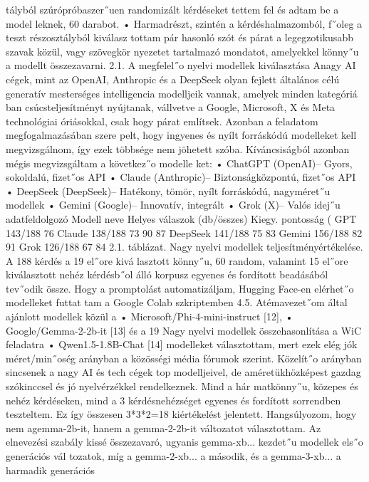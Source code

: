 \documentclass[12pt]{report}
\theoremstyle{definition}
\begin{document}
tályból szúrópróbaszer˝uen randomizált kérdéseket tettem fel és adtam be a model
leknek, 60 darabot.
 • Harmadrészt, szintén a kérdéshalmazomból, f˝oleg a teszt részosztályból kiválasz
tottam pár hasonló szót és párat a legegzotikusabb szavak közül, vagy szövegkör
nyezetet tartalmazó mondatot, amelyekkel könny˝u a modellt összezavarni.
 2.1. A megfelel˝o nyelvi modellek kiválasztása
 Anagy AI cégek, mint az OpenAI, Anthropic és a DeepSeek olyan fejlett általános
 célú generatív mesterséges intelligencia modelljeik vannak, amelyek minden kategóriá
ban csúcsteljesítményt nyújtanak, vállvetve a Google, Microsoft, X és Meta technológiai
 óriásokkal, csak hogy párat említsek. Azonban a feladatom megfogalmazásában szere
pelt, hogy ingyenes és nyílt forráskódú modelleket kell megvizsgálnom, így ezek többsége
 nem jöhetett szóba. Kíváncsiságból azonban mégis megvizsgáltam a következ˝o modelle
ket:
 • ChatGPT (OpenAI)– Gyors, sokoldalú, fizet˝os API
 • Claude (Anthropic)– Biztonságközpontú, fizet˝os API
 • DeepSeek (DeepSeek)– Hatékony, tömör, nyílt forráskódú, nagyméret˝u modellek
 • Gemini (Google)– Innovatív, integrált
 • Grok (X)– Valós idej˝u adatfeldolgozó
 Modell neve Helyes válaszok (db/összes) Kiegy. pontosság (%
 GPT
 143/188
 76
 Claude
 138/188
 73
 90
 87
 DeepSeek
 141/188
 75
 83
 Gemini
 156/188
 82
 91
 Grok
 126/188
 67
 84
 2.1. táblázat. Nagy nyelvi modellek teljesítményértékelése. A 188 kérdés a 19 el˝ore kivá
lasztott könny˝u, 60 random, valamint 15 el˝ore kiválasztott nehéz kérdésb˝ol álló korpusz
 egyenes és fordított beadásából tev˝odik össze.
 Hogy a promptolást automatizáljam, Hugging Face-en elérhet˝o modelleket futtat
tam a Google Colab szkriptemben 4.5.
 Atémavezet˝om által ajánlott modellek közül a
 • Microsoft/Phi-4-mini-instruct [12],
 • Google/Gemma-2-2b-it [13] és a
 19
Nagy nyelvi modellek összehasonlítása a WiC feladatra
 • Qwen1.5-1.8B-Chat [14]
 modelleket választottam, mert ezek elég jók méret/min˝oség arányban a közösségi média
 fórumok szerint. Közelít˝o arányban sincsenek a nagy AI és tech cégek top modelljeivel,
 de améretükhözképest gazdag szókinccsel és jó nyelvérzékkel rendelkeznek. Mind a hár
matkönny˝u, közepes és nehéz kérdéseken, mind a 3 kérdésnehézséget egyenes és fordított
 sorrendben teszteltem. Ez így összesen 3*3*2=18 kiértékelést jelentett. Hangsúlyozom,
 hogy nem agemma-2b-it, hanem a gemma-2-2b-it változatot választottam. Az elnevezési
 szabály kissé összezavaró, ugyanis gemma-xb... kezdet˝u modellek els˝o generációs vál
tozatok, míg a gemma-2-xb... a második, és a gemma-3-xb... a harmadik generációs
\end{document}

